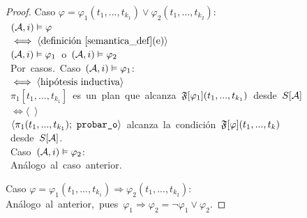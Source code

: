 \begin{proof}
\noindent Caso $\varphi = \varphi_1(t_1,...,t_{k_1}) \lor \varphi_2(t_1,...,t_{k_2}) $:\\
\mbox{\hspace{10mm} $(\mathcal{A}, i) \vDash \varphi$}\\
\mbox{\hspace{5mm} $\iff \langle \text{definición \ref{semantica_def}(e)} \rangle$}\\
\mbox{\hspace{10mm} $(\mathcal{A}, i) \vDash \varphi_1$ o $(\mathcal{A}, i) \vDash \varphi_2$}\\
\mbox{\hspace{5mm} Por casos. Caso $(\mathcal{A}, i) \vDash \varphi_1$:}\\
\mbox{\hspace{10mm} $\iff \langle \text{hipótesis inductiva} \rangle$}\\
\mbox{\hspace{15mm} $\pi_1[t_1,...,t_{k_1}]$ es un plan que
alcanza $\mathfrak{F}[\varphi_1](t_1,...,t_{k_1})$ desde $S[\mathcal{A}]$}\\
\mbox{\hspace{10mm} $\iff \langle$  $\rangle$}\\
\mbox{\hspace{15mm} $\tup{\pi_1(t_1,...,t_{k_1});\ \texttt{probar\_o}}$ alcanza la condición
$\mathfrak{F}[\varphi](t_1,...,t_k)$}\\
\mbox{\hspace{15mm} desde $S[\mathcal{A}]$.}\\
\mbox{\hspace{5mm} Caso $(\mathcal{A}, i) \vDash \varphi_2$:}\\
\mbox{\hspace{10mm} Análogo al caso anterior.}

\noindent Caso $\varphi = \varphi_1(t_1,...,t_{k_1}) \Rightarrow \varphi_2(t_1,...,t_{k_2}) $:\\
\mbox{\hspace{10mm}Análogo al anterior, pues $\varphi_1 \Rightarrow \varphi_2 =
\neg \varphi_1 \lor \varphi_2$.}


\end{proof}
